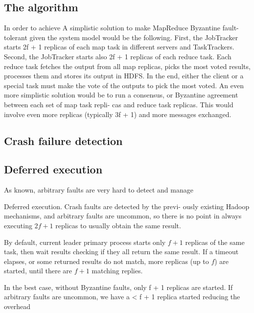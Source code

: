 \documentclass[sigchi]{acmart}
\begin{document}
 

\subsection{The algorithm}

In order to achieve 
A simplistic solution to make MapReduce
Byzantine fault-tolerant given the system model would be the
following. First, the JobTracker starts 2f + 1 replicas of each
map task in different servers and TaskTrackers. Second, the
JobTracker starts also 2f + 1 replicas of each reduce task.
Each reduce task fetches the output from all map replicas,
picks the most voted results, processes them and stores its
output in HDFS. In the end, either the client or a special task
must make the vote of the outputs to pick the most voted. An
even more simplistic solution would be to run a consensus,
or Byzantine agreement between each set of map task repli-
cas and reduce task replicas. This would involve even more
replicas (typically 3f + 1) and more messages exchanged.




\subsection{Crash failure detection}

\subsection{Deferred execution} As known, arbitrary faults are very hard to detect and manage 



Deferred execution. Crash faults are detected by the previ-
ously existing Hadoop mechanisms, and arbitrary faults are
uncommon, so there is no point in always executing $2f + 1$ replicas to usually obtain the same result.




By default, current leader primary process starts only $f + 1$ replicas of the same task, then wait results checking if they all return the same result. If a timeout elapses, or some returned results do not match, more replicas (up to $f$) are started, until there are $f + 1$ matching replies.



In the best case, without Byzantine faults, only f + 1 replicas are started. If arbitrary faults are uncommon, we have a < f + 1 replica started reducing the overhead 





\appendix
\end{document}
